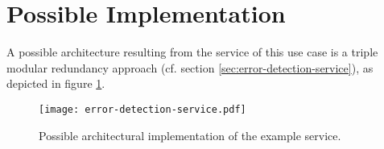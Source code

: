 \section{Possible Implementation}

A possible architecture resulting from the service of this use case is a triple modular redundancy approach (cf. section \ref{sec:error-detection-service}), as depicted in figure \ref{fig:example-service-architecture}. 


\begin{figure}[ht]
\centering
\texttt{[image: error-detection-service.pdf]}
\caption{Possible architectural implementation of the example service.}
\label{fig:example-service-architecture}
\end{figure}